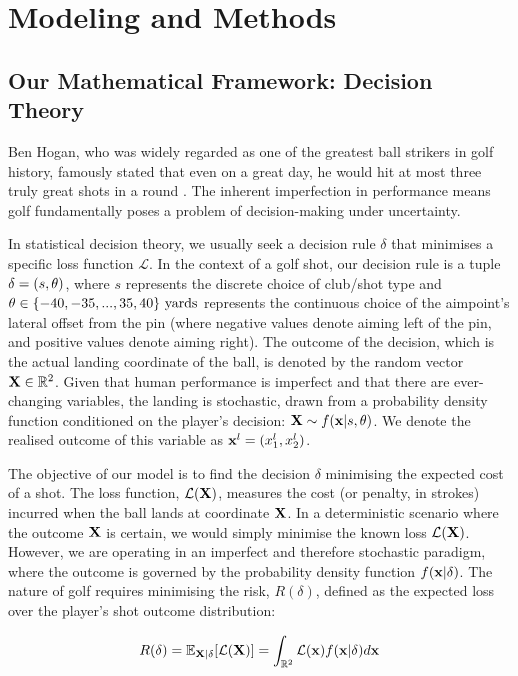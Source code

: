 \documentclass[11pt, letterpaper]{article}
\begin{document}
\section{Modeling and Methods}
\label{sec:Modeling}

\subsection{Our Mathematical Framework: Decision Theory}

Ben Hogan, who was widely regarded as one of the greatest ball strikers in golf history, famously stated that even on a great day, he would hit at most three  truly great shots in a round \parencite{Jenkins_1998}. The inherent imperfection in performance means golf fundamentally poses a problem of decision-making under uncertainty.

In statistical decision theory, we usually seek a decision rule $\delta$ that minimises a specific loss function $\mathcal{L}$. In the context of a golf shot, our decision rule is a tuple $\delta = (s, \theta)$, where $s$ represents the discrete choice of club/shot type and $\theta \in \{-40, -35, ..., 35,  40 \}\text{ yards}$ represents the continuous choice of the aimpoint's lateral offset from the pin (where negative values denote aiming left of the pin, and positive values denote aiming right). The outcome of the decision, which is the actual landing coordinate of the ball, is denoted by the random vector $\mathbf{X} \in \mathbb{R}^2$. Given that human performance is imperfect and that there are ever-changing variables, the landing is stochastic, drawn from a probability density function conditioned on the player's decision: $\mathbf{X} \sim f(\mathbf{x} | s, \theta) $. We denote the realised outcome of this variable as $\mathbf{x}^l = (x_1^l,x_2^l)$.


The objective of our model is to find the decision $\delta$ minimising the expected cost of a shot. The loss function, $\mathcal{L}(\mathbf{X})$, measures the cost (or penalty, in strokes) incurred when the ball lands at coordinate $\mathbf{X}$. In a deterministic scenario where the outcome $\mathbf{X}$ is certain, we would simply minimise the known loss $\mathcal{L}(\mathbf{X})$. However, we are operating in an imperfect and therefore stochastic paradigm, where the outcome is governed by the probability density function $f(\mathbf{x} | \delta)$. The nature of golf requires minimising the risk, $R(\delta)$, defined as the expected loss over the player's shot outcome distribution:

$$R(\delta) = \mathbb{E}_{\mathbf{X}|\delta}[\mathcal{L}(\mathbf{X})] = \int_{\mathbb{R}^2}\mathcal{L}(\mathbf{x})f(\mathbf{x} | \delta)d\mathbf{x}$$
\end{document}

